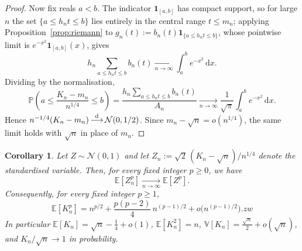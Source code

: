 \documentclass[english,11pt]{smfart}
\newcommand{\Prb}[1]{\mathbb{P}\left(#1\right)}
\newcommand{\Exb}[1]{\mathbb{E}\left[#1\right]}
\newcommand{\Vab}[1]{\mathbb{V}\left[#1\right]}
\newcommand{\convdis}{\,{\buildrel \mathrm{d} \over \longrightarrow}\,}
\newcommand{\cN}{\mathcal{N}}
\newtheorem{corollary}[theorem]{Corollary}
\numberwithin{equation}{section}
\begin{document}
\begin{proof}
Now fix reals $a<b$. The indicator $\mathbf 1_{[a,b]}$ has compact support, so for
large $n$ the set $\{a\le h_n t\le b\}$ lies entirely in the central range
$t\le m_n$; applying Proposition~\ref{prop:riemann} to
$g_n(t):=b_n(t)\mathbf 1_{\{a\le h_n t\le b\}}$, whose pointwise limit is
$e^{-x^2}\mathbf 1_{[a,b]}(x)$, gives
\[
  h_n\!\!\sum_{a\le h_n t\le b}\!\! b_n(t)
  \xrightarrow[n\to\infty]{}\int_a^b e^{-x^2}\,\mathrm dx .
\]
Dividing by the normalisation,
\[
  \Prb{a\le\frac{K_n-m_n}{n^{1/4}}\le b}
  =\frac{h_n\sum_{a\le h_n t\le b}b_n(t)}{A_n}
  \xrightarrow[n\to\infty]{}\frac{1}{\sqrt\pi}\int_a^b e^{-x^2}\,\mathrm dx .
\]
Hence $n^{-1/4}(K_n-m_n)\convdis\cN(0,1/2)$. Since $m_n-\sqrt n=o(n^{1/4})$,
the same limit holds with $\sqrt n$ in place of $m_n$.
\end{proof}


\begin{corollary}
\label{co:Knmoments}
Let $Z\sim\cN(0,1)$ and let $Z_n:=\sqrt2\,(K_n-\sqrt n)/n^{1/4}$ denote the
standardised variable. Then, for every fixed integer $p\ge0$, we have
\[
  \Exb{Z_n^{p}}
  \xrightarrow[n\to\infty]{}\Exb{Z^{p}} .
\]
Consequently, for every fixed integer $p\ge1$,
\[
  \Exb{K_n^{p}}=n^{p/2}+\frac{p(p-2)}{4}\,n^{(p-1)/2}+o\bigl(n^{(p-1)/2}\bigr).zw
\]
In particular $\Exb{K_n}=\sqrt n-\tfrac14+o(1)$, $\Exb{K_n^2} = n$,
$\Vab{K_n}=\tfrac{\sqrt n}{2}+o(\sqrt n)$, and $K_n/\sqrt n\to1$ in probability.
\end{corollary}
\end{document}
